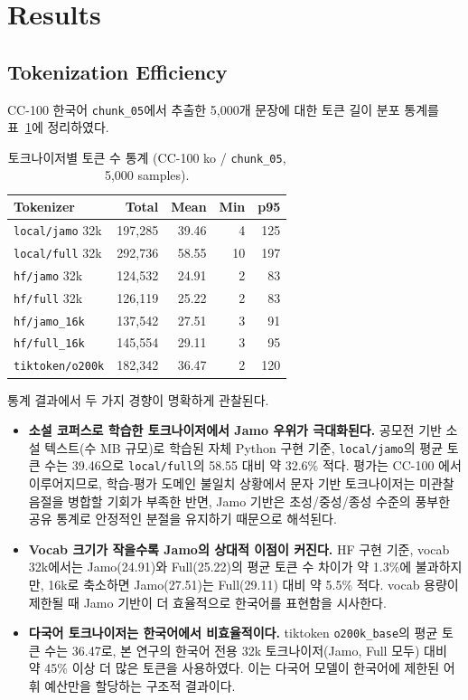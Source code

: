 \documentclass[sigconf,nonacm]{acmart}
\begin{document}
\section{Results}
\label{sec:results}

\subsection{Tokenization Efficiency}

CC-100 한국어 \texttt{chunk\_05}에서 추출한 5,000개 문장에 대한 토큰 길이 분포 통계를
표~\ref{tab:stats}에 정리하였다.

\begin{table}[h]
\caption{토크나이저별 토큰 수 통계 (CC-100 ko / \texttt{chunk\_05}, 5{,}000 samples).}
\label{tab:stats}
\small
\begin{tabular}{lrrrr}
\toprule
Tokenizer & Total & Mean & Min & p95 \\
\midrule
\texttt{local/jamo} 32k    & 197{,}285 & 39.46 & 4  & 125 \\
\texttt{local/full} 32k    & 292{,}736 & 58.55 & 10 & 197 \\
\texttt{hf/jamo} 32k       & 124{,}532 & 24.91 & 2  & 83  \\
\texttt{hf/full} 32k       & 126{,}119 & 25.22 & 2  & 83  \\
\texttt{hf/jamo\_16k}      & 137{,}542 & 27.51 & 3  & 91  \\
\texttt{hf/full\_16k}      & 145{,}554 & 29.11 & 3  & 95  \\
\texttt{tiktoken/o200k}    & 182{,}342 & 36.47 & 2  & 120 \\
\bottomrule
\end{tabular}
\end{table}

통계 결과에서 두 가지 경향이 명확하게 관찰된다.
\begin{itemize}
    \item \textbf{소설 코퍼스로 학습한 토크나이저에서 Jamo 우위가 극대화된다.} 공모전 기반
    소설 텍스트(수 MB 규모)로 학습된 자체 Python 구현 기준, \texttt{local/jamo}의 평균 토큰 수는
    39.46으로 \texttt{local/full}의 58.55 대비 약 32.6\% 적다. 평가는 CC-100 에서
    이루어지므로, 학습-평가 도메인 불일치 상황에서 문자 기반 토크나이저는 미관찰 음절을 병합할
    기회가 부족한 반면, Jamo 기반은 초성/중성/종성 수준의 풍부한 공유 통계로 안정적인 분절을
    유지하기 때문으로 해석된다.
    \item \textbf{Vocab 크기가 작을수록 Jamo의 상대적 이점이 커진다.} HF 구현 기준, vocab 32k에서는
    Jamo(24.91)와 Full(25.22)의 평균 토큰 수 차이가 약 1.3\%에 불과하지만,
    16k로 축소하면 Jamo(27.51)는 Full(29.11) 대비 약 5.5\% 적다. vocab 용량이 제한될 때
    Jamo 기반이 더 효율적으로 한국어를 표현함을 시사한다.
    \item \textbf{다국어 토크나이저는 한국어에서 비효율적이다.} tiktoken \texttt{o200k\_base}의 평균 토큰 수는
    36.47로, 본 연구의 한국어 전용 32k 토크나이저(Jamo, Full 모두) 대비 약 45\% 이상 더 많은 토큰을
    사용하였다. 이는 다국어 모델이 한국어에 제한된 어휘 예산만을 할당하는 구조적 결과이다.
\end{itemize}
\end{document}
